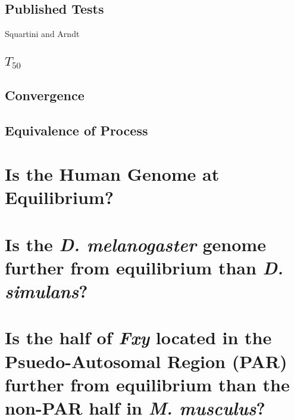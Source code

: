 \subsection{Published Tests}
Squartini and Arndt 




\subsection{$T_{50}$}





\subsection{Convergence}



\subsection{Equivalence of Process}

\section{Is the Human Genome at Equilibrium?}

\section{Is the \textit{D. melanogaster} genome further from equilibrium than \textit{D. simulans}?}

\section{Is the half of \textit{Fxy} located in the Psuedo-Autosomal Region (PAR) further from equilibrium than the non-PAR half in \textit{M. musculus}?}